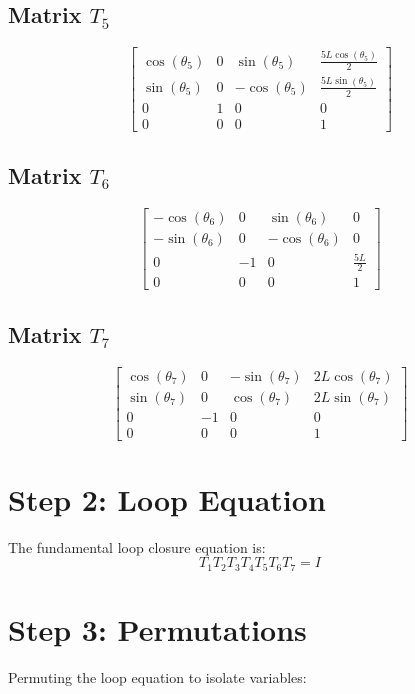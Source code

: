 \documentclass[12pt, a4paper]{article}
\begin{document}
\subsection*{Matrix $T_{5}$}
\[ \left[\begin{matrix}\cos{\left(\theta_{5} \right)} & 0 & \sin{\left(\theta_{5} \right)} & \frac{5 L \cos{\left(\theta_{5} \right)}}{2}\\\sin{\left(\theta_{5} \right)} & 0 & - \cos{\left(\theta_{5} \right)} & \frac{5 L \sin{\left(\theta_{5} \right)}}{2}\\0 & 1 & 0 & 0\\0 & 0 & 0 & 1\end{matrix}\right] \]
\subsection*{Matrix $T_{6}$}
\[ \left[\begin{matrix}- \cos{\left(\theta_{6} \right)} & 0 & \sin{\left(\theta_{6} \right)} & 0\\- \sin{\left(\theta_{6} \right)} & 0 & - \cos{\left(\theta_{6} \right)} & 0\\0 & -1 & 0 & \frac{5 L}{2}\\0 & 0 & 0 & 1\end{matrix}\right] \]
\subsection*{Matrix $T_{7}$}
\[ \left[\begin{matrix}\cos{\left(\theta_{7} \right)} & 0 & - \sin{\left(\theta_{7} \right)} & 2 L \cos{\left(\theta_{7} \right)}\\\sin{\left(\theta_{7} \right)} & 0 & \cos{\left(\theta_{7} \right)} & 2 L \sin{\left(\theta_{7} \right)}\\0 & -1 & 0 & 0\\0 & 0 & 0 & 1\end{matrix}\right] \]


\section{Step 2: Loop Equation}
The fundamental loop closure equation is:
\[ T_1 T_2 T_3 T_4 T_5 T_6 T_7 = I \]


\section{Step 3: Permutations}
Permuting the loop equation to isolate variables:
\end{document}
